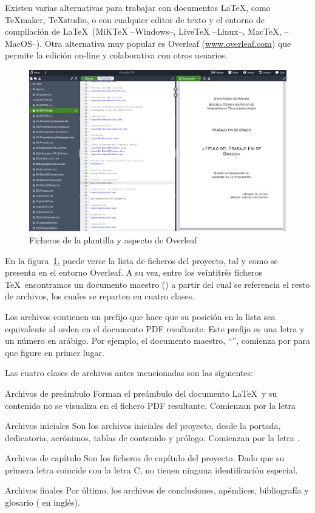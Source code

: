 Existen varias alternativas para trabajar con documentos \LaTeX, como \TeX maker, \TeX studio, o con cualquier editor de texto y el entorno de compilación de \LaTeX\ (MiKTeX --Windows--, LiveTeX --Linux--, MacTeX, --MacOS--). Otra alternativa muy popular es  Overleaf (\url{www.overleaf.com}) que permite la edición on-line y colaborativa con otros usuarios.

\begin{figure}[ht]
	\centering
		\includegraphics[width=\linewidth]{figuras/overleaf.png}
	\caption{Ficheros de la plantilla y aspecto de Overleaf}
	\label{fig:ficherosPlan}
\end{figure}

En la figura~\ref{fig:ficherosPlan}, puede verse la lista de ficheros del proyecto, tal y como se presenta en el entorno Overleaf. A su vez, entre los veintitrés ficheros \TeX\ encontramos un documento maestro () a partir del cual se referencia el resto de archivos, los cuales se reparten en cuatro clases.

Los archivos contienen un prefijo que hace que su posición en la lista sea equivalente al orden en el documento PDF resultante. Este prefijo es una letra y un número en arábigo. Por ejemplo, el documento maestro, ``'', comienza por  para que figure en primer lugar.

Las cuatro clases de archivos antes mencionadas son las siguientes:

\begin{descript}
	\item[Archivos de preámbulo] Forman el preámbulo del documento \LaTeX\ y su contenido no se visualiza en el fichero PDF resultante. Comienzan por la letra 
	\item[Archivos iniciales] Son los archivos iniciales del proyecto, desde la portada, dedicatoria, acrónimos, tablas de contenido y prólogo. Comienzan por la letra .
	\item[Archivos de capítulo] Son los ficheros de capítulo del proyecto. Dado que su primera letra coincide con la letra C, no tienen ninguna identificación especial.
	\item[Archivos finales] Por último, los archivos de conclusiones, apéndices, bibliografía y glosario ( en inglés).
\end{descript}

